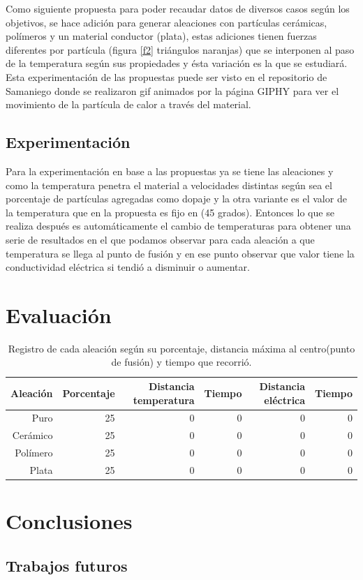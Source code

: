 \documentclass[3pt,twocolumn]{elsarticle}
\begin{document}
Como siguiente propuesta para poder recaudar datos de diversos casos según los objetivos, se hace adición para generar aleaciones con partículas cerámicas, polímeros y un material conductor (plata), estas adiciones tienen fuerzas diferentes por partícula (figura \ref{f2} triángulos naranjas) que se interponen al paso de la temperatura según sus propiedades y ésta variación es la que se estudiará. Esta experimentación de las propuestas puede ser visto en el repositorio de Samaniego \cite{Edson} donde se realizaron gif animados por la página GIPHY \cite{GIPHY} para ver el movimiento de la partícula de calor a través del material.

\subsection{Experimentación}
Para la experimentación en base a las propuestas ya se tiene las aleaciones y como la temperatura penetra el material a velocidades distintas según sea el porcentaje de partículas agregadas como dopaje y la otra variante es el valor de la temperatura que en la propuesta es fijo en (45 grados). Entonces lo que se realiza después es automáticamente el cambio de temperaturas para obtener una serie de resultados en el que podamos observar para cada aleación a que temperatura se llega al punto de fusión y en ese punto observar que valor tiene la conductividad eléctrica si tendió a disminuir o aumentar.



\section{Evaluación}\label{intr}
\begin{table}[H]
        \caption{Registro de cada aleación según su porcentaje, distancia máxima al centro(punto de fusión) y tiempo que recorrió.}
        \bigskip
        \label{tab1}
        \centering
        \begin{tabular}{|r|r|r|r|r|r|}
        \hline
         Aleación&Porcentaje&Distancia temperatura&Tiempo&Distancia eléctrica&Tiempo\\
        \hline
         Puro & 25 & 0 & 0 & 0 & 0 \\
        \hline
        Cerámico & 25 & 0 & 0 & 0 & 0 \\
        \hline
         Polímero & 25 & 0 & 0 & 0 & 0\\
        \hline
        Plata & 25 & 0 & 0 & 0 & 0 \\
        \hline
        \end{tabular}
    \end{table}
\section{Conclusiones}\label{intr}

\subsection{Trabajos futuros}



\end{document}
